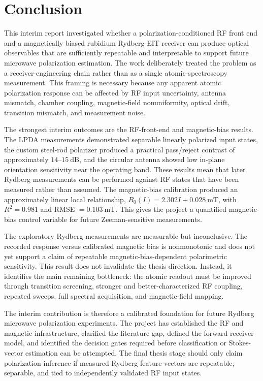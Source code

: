 \documentclass{ieeeaccess}
\begin{document}
\section{Conclusion}
\label{sec:conclusion}

This interim report investigated whether a polarization-conditioned RF front end and a magnetically biased rubidium Rydberg-EIT receiver can produce optical observables that are sufficiently repeatable and interpretable to support future microwave polarization estimation. The work deliberately treated the problem as a receiver-engineering chain rather than as a single atomic-spectroscopy measurement. This framing is necessary because any apparent atomic polarization response can be affected by RF input uncertainty, antenna mismatch, chamber coupling, magnetic-field nonuniformity, optical drift, transition mismatch, and measurement noise.

The strongest interim outcomes are the RF-front-end and magnetic-bias results. The LPDA measurements demonstrated separable linearly polarized input states, the custom steel-rod polarizer produced a practical pass/reject contrast of approximately \(14\text{--}15~\mathrm{dB}\), and the circular antenna showed low in-plane orientation sensitivity near the operating band. These results mean that later Rydberg measurements can be performed against RF states that have been measured rather than assumed. The magnetic-bias calibration produced an approximately linear local relationship, \(B_0(I)=2.302I+0.028~\mathrm{mT}\), with \(R^2=0.981\) and RMSE \(=0.103~\mathrm{mT}\). This gives the project a quantified magnetic-bias control variable for future Zeeman-sensitive measurements.

The exploratory Rydberg measurements are measurable but inconclusive. The recorded response versus calibrated magnetic bias is nonmonotonic and does not yet support a claim of repeatable magnetic-bias-dependent polarimetric sensitivity. This result does not invalidate the thesis direction. Instead, it identifies the main remaining bottleneck: the atomic readout must be improved through transition screening, stronger and better-characterized RF coupling, repeated sweeps, full spectral acquisition, and magnetic-field mapping.

The interim contribution is therefore a calibrated foundation for future Rydberg microwave polarization experiments. The project has established the RF and magnetic infrastructure, clarified the literature gap, defined the forward receiver model, and identified the decision gates required before classification or Stokes-vector estimation can be attempted. The final thesis stage should only claim polarization inference if measured Rydberg feature vectors are repeatable, separable, and tied to independently validated RF input states.
\end{document}
